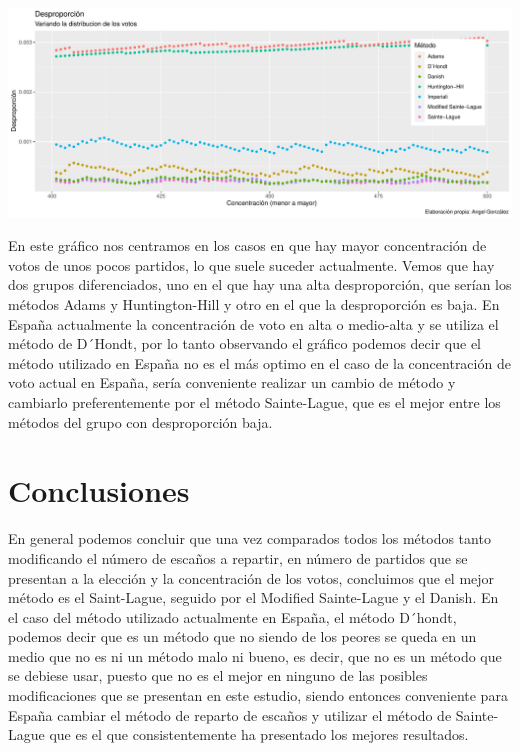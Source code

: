 \documentclass[12pt,a4paper,]{book}
\numberwithin{dummy}{section}
\theoremstyle{ocrenumbox}
\theoremstyle{blacknumex}
\theoremstyle{blacknumbox}
\theoremstyle{ocrenum}
\theoremstyle{ocrenum}
\begin{document}
\begin{center}\includegraphics[width=0.95\linewidth]{figurasR/unnamed-chunk-47-1} \end{center}

En este gráfico nos centramos en los casos en que hay mayor
concentración de votos de unos pocos partidos, lo que suele suceder
actualmente. Vemos que hay dos grupos diferenciados, uno en el que hay
una alta desproporción, que serían los métodos Adams y Huntington-Hill y
otro en el que la desproporción es baja. En España actualmente la
concentración de voto en alta o medio-alta y se utiliza el método de
D´Hondt, por lo tanto observando el gráfico podemos decir que el método
utilizado en España no es el más optimo en el caso de la concentración
de voto actual en España, sería conveniente realizar un cambio de método
y cambiarlo preferentemente por el método Sainte-Lague, que es el mejor
entre los métodos del grupo con desproporción baja.

\hypertarget{conclusiones}{%
\section{Conclusiones}\label{conclusiones}}

En general podemos concluir que una vez comparados todos los métodos
tanto modificando el número de escaños a repartir, en número de partidos
que se presentan a la elección y la concentración de los votos,
concluimos que el mejor método es el Saint-Lague, seguido por el
Modified Sainte-Lague y el Danish. En el caso del método utilizado
actualmente en España, el método D´hondt, podemos decir que es un método
que no siendo de los peores se queda en un medio que no es ni un método
malo ni bueno, es decir, que no es un método que se debiese usar, puesto
que no es el mejor en ninguno de las posibles modificaciones que se
presentan en este estudio, siendo entonces conveniente para España
cambiar el método de reparto de escaños y utilizar el método de
Sainte-Lague que es el que consistentemente ha presentado los mejores
resultados.
\end{document}
